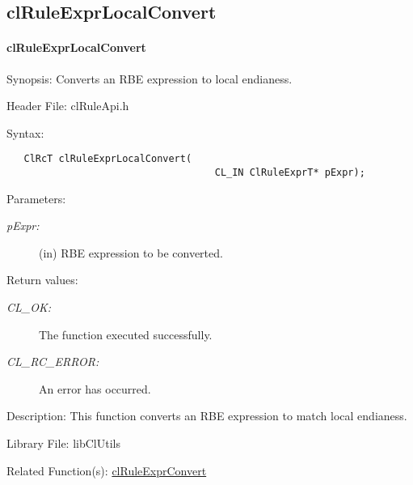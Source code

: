 \begin{flushleft}
\subsection{clRuleExprLocalConvert}
\hypertarget{pagerule107}{}\paragraph{cl\-Rule\-Expr\-Local\-Convert}\label{pagerule107}
\begin{Desc}
\item[Synopsis:]Converts an RBE expression to local endianess.\end{Desc}
\begin{Desc}
\item[Header File:]clRuleApi.h\end{Desc}
\begin{Desc}
\item[Syntax:]

\footnotesize\begin{verbatim}   ClRcT clRuleExprLocalConvert(
                              		CL_IN ClRuleExprT* pExpr);
\end{verbatim}
\normalsize
\end{Desc}
\begin{Desc}
\item[Parameters:]
\begin{description}
\item[{\em p\-Expr:}](in) RBE expression to be converted.\end{description}
\end{Desc}
\begin{Desc}
\item[Return values:]
\begin{description}
\item[{\em CL\_\-OK:}]The function executed successfully. \item[{\em CL\_\-RC\_\-ERROR:}]An error has occurred.\end{description}
\end{Desc}
\begin{Desc}
\item[Description:]This function converts an RBE expression to match local endianess.\end{Desc}
\begin{Desc}
\item[Library File:]lib\-Cl\-Utils\end{Desc}
\begin{Desc}
\item[Related Function(s):]\hyperlink{pagerule108}{cl\-Rule\-Expr\-Convert} \end{Desc}
\newpage



\end{flushleft}
